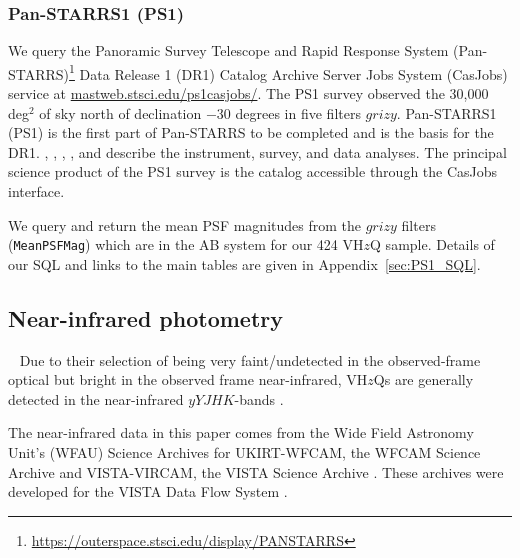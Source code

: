 \documentclass[usenatbib]{mnras}
\begin{document}
    \subsubsection{Pan-STARRS1 (PS1)} 
    We query the Panoramic Survey Telescope and Rapid Response System
    (Pan-STARRS)\footnote{\href{https://outerspace.stsci.edu/display/PANSTARRS}{https://outerspace.stsci.edu/display/PANSTARRS}}
    Data Release 1 (DR1) Catalog Archive Server Jobs System (CasJobs)
    service at
    \href{http://mastweb.stsci.edu/ps1casjobs/}{mastweb.stsci.edu/ps1casjobs/}.
    The PS1 survey observed the 30,000 deg$^{2}$ of sky north of
    declination $-30$ degrees in five filters $grizy$.  Pan-STARRS1 (PS1)
    is the first part of Pan-STARRS to be completed and is the basis for
    the DR1.  \citet{Chambers2016}, \citet{Magnier2016a},
    \citet{Waters2016}, \citet{Magnier2016b}, \citet{Magnier2016c} and
    \citet{Flewelling2016} describe the instrument, survey, and data
    analyses.  The principal science product of the PS1 survey is the
    catalog accessible through the CasJobs interface.
    
    We query and return the mean PSF magnitudes from the $grizy$ filters
    ({\tt MeanPSFMag}) which are in the AB system for our 424 VH$z$Q
    sample. Details of our SQL and links to the main tables are given
    in Appendix~\ref{sec:PS1_SQL}.
    
    \iffalse
    \subsubsection{DECam} 
    The Dark Energy Camera \citep[DECam][]{Flaugher2015} is 
    is a wide-field imager with a 2.2 degree diameter field of view 
    mounted at the prime focus of the Victor M. Blanco 4 m telescope 
    at the Cerro Tololo International Observatory. We use data 
    from both the Dark Energy Survey \citep[DES; ][]{DES2016} and 
    the DESI Legacy Imaging Survey \citep[DECaLS; ][]{Dey2018}. 
    \fi
    

\subsection{Near-infrared photometry}~\label{sec:NIR_data} 
Due to their selection of being very faint/undetected in the
observed-frame optical but bright in the observed frame near-infrared,
VH$z$Qs are generally detected in the near-infrared $yYJHK$-bands
\citep[$\approx$0.98-2.38$\mu$m; e.g., ][]{Peth2011}.

The near-infrared data in this paper comes from the Wide Field Astronomy Unit's
(WFAU) Science Archives for UKIRT-WFCAM, the WFCAM Science Archive
\citep[WSA][]{WSA} and VISTA-VIRCAM, the VISTA Science Archive
\citep[VSA][]{VSA}. These archives were developed for the VISTA Data Flow System
\citep[VDFS][]{VDFS}.
\end{document}
